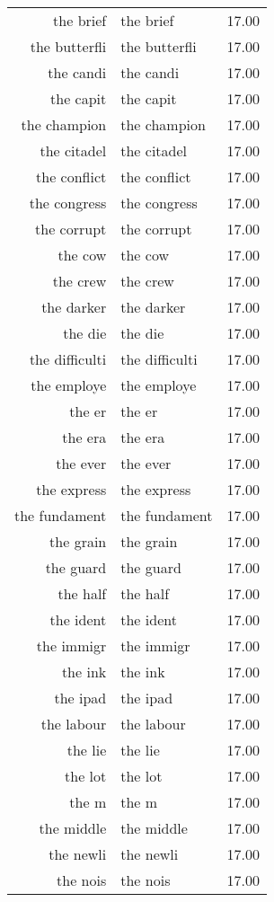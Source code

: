 \begin{table}[ht]
\begin{tabular}{rlr}
  the brief & the brief & 17.00 \\ 
  the butterfli & the butterfli & 17.00 \\ 
  the candi & the candi & 17.00 \\ 
  the capit & the capit & 17.00 \\ 
  the champion & the champion & 17.00 \\ 
  the citadel & the citadel & 17.00 \\ 
  the conflict & the conflict & 17.00 \\ 
  the congress & the congress & 17.00 \\ 
  the corrupt & the corrupt & 17.00 \\ 
  the cow & the cow & 17.00 \\ 
  the crew & the crew & 17.00 \\ 
  the darker & the darker & 17.00 \\ 
  the die & the die & 17.00 \\ 
  the difficulti & the difficulti & 17.00 \\ 
  the employe & the employe & 17.00 \\ 
  the er & the er & 17.00 \\ 
  the era & the era & 17.00 \\ 
  the ever & the ever & 17.00 \\ 
  the express & the express & 17.00 \\ 
  the fundament & the fundament & 17.00 \\ 
  the grain & the grain & 17.00 \\ 
  the guard & the guard & 17.00 \\ 
  the half & the half & 17.00 \\ 
  the ident & the ident & 17.00 \\ 
  the immigr & the immigr & 17.00 \\ 
  the ink & the ink & 17.00 \\ 
  the ipad & the ipad & 17.00 \\ 
  the labour & the labour & 17.00 \\ 
  the lie & the lie & 17.00 \\ 
  the lot & the lot & 17.00 \\ 
  the m & the m & 17.00 \\ 
  the middle & the middle & 17.00 \\ 
  the newli & the newli & 17.00 \\ 
  the nois & the nois & 17.00 \\ 

\end{tabular}
\end{table}
